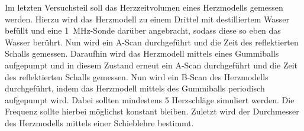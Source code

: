 Im letzten Versuchsteil soll das Herzzeitvolumen eines Herzmodells gemessen werden. Hierzu wird das Herzmodell zu einem Drittel mit
destilliertem Wasser befüllt und eine \SI{1}{\mega\hertz}-Sonde darüber angebracht, sodass diese so eben das Wasser berührt.
Nun wird ein A-Scan durchgeführt und die Zeit des reflektierten Schalls gemessen. Daraufhin wird das Herzmodell mittels eines Gummiballs
aufgepumpt und in diesem Zustand erneut ein A-Scan durchgeführt und die Zeit des reflektierten Schalls gemessen.
Nun wird ein B-Scan des Herzmodells durchgeführt, indem das Herzmodell mittels des Gummiballs periodisch aufgepumpt wird. Dabei
sollten mindestens 5 Herzschläge simuliert werden. Die Frequenz sollte hierbei möglichst konstant bleiben. Zuletzt wird
der Durchmesser des Herzmodells mittels einer Schieblehre bestimmt.
